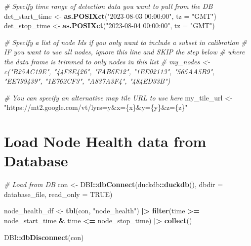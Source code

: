 \documentclass[
]{book}
\newenvironment{Shaded}{\begin{snugshade}}{\end{snugshade}}
\newcommand{\AttributeTok}[1]{\textcolor[rgb]{0.13,0.29,0.53}{#1}}
\newcommand{\CommentTok}[1]{\textcolor[rgb]{0.56,0.35,0.01}{\textit{#1}}}
\newcommand{\ConstantTok}[1]{\textcolor[rgb]{0.56,0.35,0.01}{#1}}
\newcommand{\FunctionTok}[1]{\textcolor[rgb]{0.13,0.29,0.53}{\textbf{#1}}}
\newcommand{\NormalTok}[1]{#1}
\newcommand{\OtherTok}[1]{\textcolor[rgb]{0.56,0.35,0.01}{#1}}
\newcommand{\SpecialCharTok}[1]{\textcolor[rgb]{0.81,0.36,0.00}{\textbf{#1}}}
\newcommand{\StringTok}[1]{\textcolor[rgb]{0.31,0.60,0.02}{#1}}
\begin{document}
\begin{Shaded}
\begin{Highlighting}[]
\CommentTok{\# Specify time range of detection data you want to pull from the DB}
\NormalTok{det\_start\_time }\OtherTok{\textless{}{-}} \FunctionTok{as.POSIXct}\NormalTok{(}\StringTok{"2023{-}08{-}03 00:00:00"}\NormalTok{, }\AttributeTok{tz =} \StringTok{"GMT"}\NormalTok{)}
\NormalTok{det\_stop\_time }\OtherTok{\textless{}{-}} \FunctionTok{as.POSIXct}\NormalTok{(}\StringTok{"2023{-}08{-}04 00:00:00"}\NormalTok{, }\AttributeTok{tz =} \StringTok{"GMT"}\NormalTok{)}

\CommentTok{\# Specify a list of node Ids if you only want to include a subset in calibration}
\CommentTok{\# IF you want to use all nodes, ignore this line and SKIP the step below}
\CommentTok{\# where the data frame is trimmed to only nodes in this list}
\CommentTok{\# my\_nodes \textless{}{-} c("B25AC19E", "44F8E426", "FAB6E12", "1EE02113", "565AA5B9", "EE799439", "1E762CF3", "A837A3F4", "484ED33B")}

\CommentTok{\# You can specify an alternative map tile URL to use here}
\NormalTok{my\_tile\_url }\OtherTok{\textless{}{-}} \StringTok{"https://mt2.google.com/vt/lyrs=y\&x=\{x\}\&y=\{y\}\&z=\{z\}"}
\end{Highlighting}
\end{Shaded}

\section{Load Node Health data from Database}\label{load-node-health-data-from-database}

\begin{Shaded}
\begin{Highlighting}[]
\CommentTok{\# Load from DB}
\NormalTok{con }\OtherTok{\textless{}{-}}\NormalTok{ DBI}\SpecialCharTok{::}\FunctionTok{dbConnect}\NormalTok{(duckdb}\SpecialCharTok{::}\FunctionTok{duckdb}\NormalTok{(), }
                      \AttributeTok{dbdir =}\NormalTok{ database\_file, }
                      \AttributeTok{read\_only =} \ConstantTok{TRUE}\NormalTok{)}

\NormalTok{node\_health\_df }\OtherTok{\textless{}{-}} \FunctionTok{tbl}\NormalTok{(con, }\StringTok{"node\_health"}\NormalTok{) }\SpecialCharTok{|\textgreater{}}
  \FunctionTok{filter}\NormalTok{(time }\SpecialCharTok{\textgreater{}=}\NormalTok{ node\_start\_time }\SpecialCharTok{\&}\NormalTok{ time }\SpecialCharTok{\textless{}=}\NormalTok{ node\_stop\_time) }\SpecialCharTok{|\textgreater{}}
  \FunctionTok{collect}\NormalTok{()}

\NormalTok{DBI}\SpecialCharTok{::}\FunctionTok{dbDisconnect}\NormalTok{(con)}
\end{Highlighting}
\end{Shaded}
\end{document}
